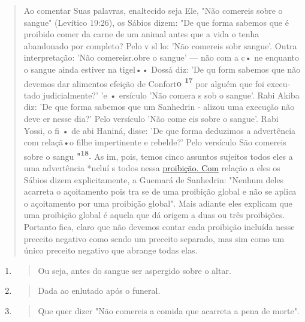 \begin{quote}
Ao comentar Suas palavras, enaltecido seja Ele, "Não comereis so­bre o
sangue" (Levítico 19:26), os Sábios dizem: "De que forma sabemos que é
proibido comer da carne de um animal antes que a vida o tenha abandonado
por completo? Pelo v sl lo: 'Não comereis sobr sangue'. Outra
interpre­tação: 'Não comereisr.obre o sangue' --- não com a c• ne
enquanto o sangue ainda estiver na tigel•• Dossá diz: 'De qu form
sabemos que não de­vemos dar alimentos efeição de Confort\textbf{o
\textsuperscript{17}} por alguém que foi execu­tado judicialmente?' 'e •
ersículo 'Não comera s sob o sangue'. Rabi Akiba diz: 'De que forma
sabemos que um Sanhedrin - alizou uma execução não deve er nesse dia?'
Pelo versículo 'Não come eis sobre o sangue'. Rabi Yossi, o fi • de abi
Haniná, disse: 'De que forma deduzimos a advertência com rela­çã•o filhe
impertinente e rebelde?' Pelo versículo São comereis sobre o san­gu
\textbf{"\textsuperscript{18}.} As im, pois, temos cinco assuntos
sujeitos todos eles a uma advertên­cia *ncluí s todos nessa
\href{http://proibição.Com}{{proibição. Com}} relação a eles os Sábios
dizem expli­citamente, a Guemará de Sanhedrin: "Nenhum deles acarreta o
açoitamento pois tra se de uma proibição global e não se aplica o
açoitamento por uma proibição global". Mais adiante eles explicam que
uma proibição global é aque­la que dá origem a duas ou três proibições.
Portanto fica, claro que não deve­mos contar cada proibição incluída
nesse preceito negativo como sendo um preceito separado, mas sim como um
único preceito negativo que abrange to­das elas.
\end{quote}

\begin{enumerate}
\def\labelenumi{\arabic{enumi}.}
\setcounter{enumi}{15}
\item
 \begin{quote}
 Ou seja, antes do sangue ser aspergido sobre o altar.
 \end{quote}
\item
 \begin{quote}
 Dada ao enlutado após o funeral.
 \end{quote}
\item
 \begin{quote}
 Que quer dizer "Não comereis a comida que acarreta a pena de morte".
 \end{quote}
\end{enumerate}

